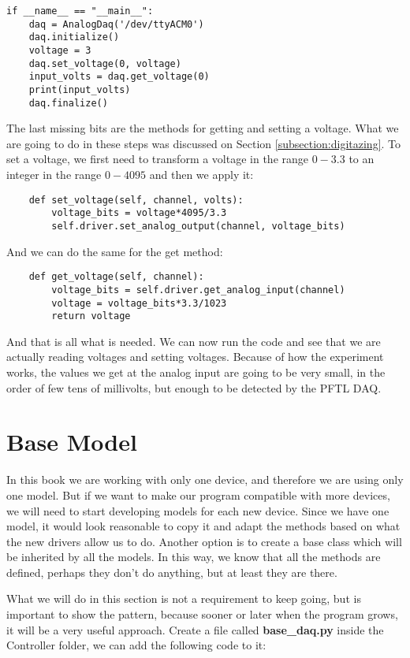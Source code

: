 \begin{verbatim}
if __name__ == "__main__":
    daq = AnalogDaq('/dev/ttyACM0')
    daq.initialize()
    voltage = 3
    daq.set_voltage(0, voltage)
    input_volts = daq.get_voltage(0)
    print(input_volts)
    daq.finalize()
\end{verbatim}

The last missing bits are the methods for getting and setting a voltage. What we are going to do in these steps was discussed on Section \ref{subsection:digitazing}. To set a voltage, we first need to transform a voltage in the range $0-3.3$ to an integer in the range $0-4095$ and then we apply it:

\begin{verbatim}
    def set_voltage(self, channel, volts):
        voltage_bits = voltage*4095/3.3
        self.driver.set_analog_output(channel, voltage_bits)
\end{verbatim}

And we can do the same for the get method:

\begin{verbatim}
    def get_voltage(self, channel):
        voltage_bits = self.driver.get_analog_input(channel)
        voltage = voltage_bits*3.3/1023
        return voltage
\end{verbatim}

And that is all what is needed. We can now run the code and see that we are actually reading voltages and setting voltages. Because of how the experiment works, the values we get at the analog input are going to be very small, in the order of few tens of millivolts, but enough to be detected by the {PFTL DAQ}. 

\section{Base Model}\label{section:base-model}
In this book we are working with only one device, and therefore we are using only one model. But if we want to make our program compatible with more devices, we will need to start developing models for each new device. Since we have one model, it would look reasonable to copy it and adapt the methods based on what the new drivers allow us to do. Another option is to create a base class which will be inherited by all the models. In this way, we know that all the methods are defined, perhaps they don't do anything, but at least they are there. 

What we will do in this section is not a requirement to keep going, but is important to show the pattern, because sooner or later when the program grows, it will be a very useful approach. Create a file called \textbf{base\_daq.py} inside the Controller folder, we can add the following code to it:

